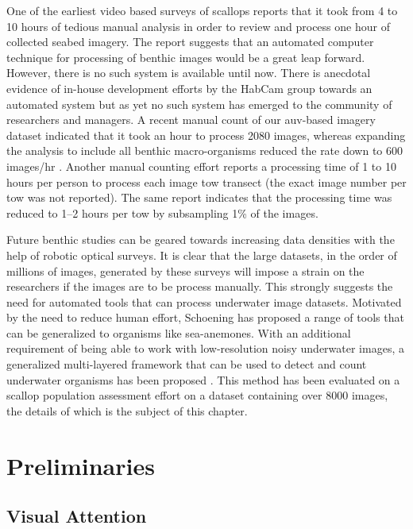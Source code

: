 \documentclass {udthesis}
\begin{document}
One of the earliest video based surveys of scallops \cite{rosenkratz} reports that
it took from 4 to 10 hours of tedious manual analysis in order to review and process one hour
of collected seabed imagery. The report suggests that an automated computer technique for
processing of benthic images would be a great leap forward. However, there is no
such system is available until now. There is anecdotal evidence of in-house development efforts by the
HabCam group \cite{gallager} towards an automated system but as yet no such
system has emerged to the community of researchers and managers. A recent manual count
of our \gls{auv}-based imagery dataset indicated that it took an hour to process 2080 images,
whereas expanding the analysis to include all benthic macro-organisms reduced the rate
down to 600 images/hr \cite{walker}. Another manual counting effort \cite{oremland} 
reports a processing time of 1 to 10 hours per person to process each image tow
transect (the exact image number per tow was not reported). The same report indicates that
the processing time was reduced to 1–2 hours per tow by subsampling 1\% of the images.

Future benthic studies can be geared towards increasing data densities with the help of robotic optical surveys.
It is clear that the large datasets, in the order of millions of images, generated by these surveys will impose 
a strain on the researchers if the images are to be process manually. This strongly suggests the need for automated tools
that can process underwater image datasets. Motivated by the need to reduce human effort, Schoening \cite{schoening} has proposed a range of tools that
can be generalized to organisms like sea-anemones. With an additional requirement of being able to work with low-resolution noisy underwater images, 
a generalized multi-layered framework that can be used to detect and count underwater organisms has been proposed \cite{prasanna_med, prasanna_aslo, prasanna_igi}. This method has been evaluated on a scallop population assessment effort on a dataset containing over 8000 images, the details of which is the subject of this chapter.

\section{Preliminaries}

\subsection{Visual Attention}
\label{sec:visual_attn}
\end{document}
